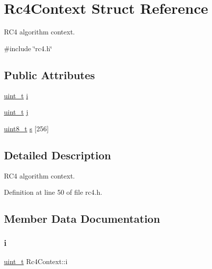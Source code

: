 \hypertarget{structRc4Context}{}\section{Rc4\+Context Struct Reference}
\label{structRc4Context}


R\+C4 algorithm context.  




{\ttfamily \#include \char`\"{}rc4.\+h\char`\"{}}

\subsection*{Public Attributes}
\begin{DoxyCompactItemize}
\item 
\hyperlink{compiler__port_8h_a12a1e9b3ce141648783a82445d02b58d}{uint\+\_\+t} \hyperlink{structRc4Context_afa2868f5817265197eabb526182b4b23}{i}
\item 
\hyperlink{compiler__port_8h_a12a1e9b3ce141648783a82445d02b58d}{uint\+\_\+t} \hyperlink{structRc4Context_a359e55af999b348d23a63790177e2e0b}{j}
\item 
\hyperlink{stdint_8h_aba7bc1797add20fe3efdf37ced1182c5}{uint8\+\_\+t} \hyperlink{structRc4Context_a4c824dd771819d672000dedd6f2a3d9d}{s} \mbox{[}256\mbox{]}
\end{DoxyCompactItemize}


\subsection{Detailed Description}
R\+C4 algorithm context. 

Definition at line 50 of file rc4.\+h.



\subsection{Member Data Documentation}
\mbox{\label{structRc4Context_afa2868f5817265197eabb526182b4b23}} 
\subsubsection{\texorpdfstring{i}{i}}
{\footnotesize\ttfamily \hyperlink{compiler__port_8h_a12a1e9b3ce141648783a82445d02b58d}{uint\+\_\+t} Rc4\+Context\+::i}



